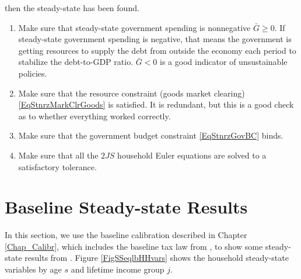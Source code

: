 \begin{enumerate}
\begin{equation*}
    \end{equation*}
    then the steady-state has been found.
    \begin{enumerate}
      \item Make sure that steady-state government spending is nonnegative $\bar{G}\geq 0$. If steady-state government spending is negative, that means the government is getting resources to supply the debt from outside the economy each period to stabilize the debt-to-GDP ratio. $\bar{G}<0$ is a good indicator of unsustainable policies.
      \item Make sure that the resource constraint (goods market clearing) \eqref{EqStnrzMarkClrGoods} is satisfied. It is redundant, but this is a good check as to whether everything worked correctly.
      \item Make sure that the government budget constraint \eqref{EqStnrzGovBC} binds.
      \item Make sure that all the $2JS$ household Euler equations are solved to a satisfactory tolerance.
    \end{enumerate}
  \end{enumerate}

  \renewcommand\theenumi{\roman{enumi}}


\section{Baseline Steady-state Results}\label{SecSSeqlbResults}

  In this section, we use the baseline calibration described in Chapter \ref{Chap_Calibr}, which includes the baseline tax law from \taxcalc, to show some steady-state results from \ogindia. Figure \ref{FigSSeqlbHHvars} shows the household steady-state variables by age $s$ and lifetime income group $j$.

